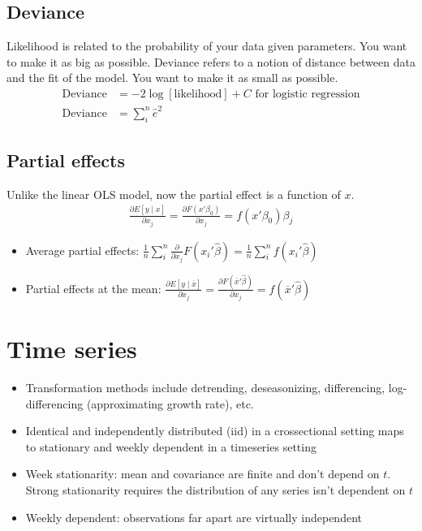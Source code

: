 \documentclass{article}
\begin{document}
\subsection{Deviance}
Likelihood is related to the probability of your data given parameters. You want to make it as big as possible. Deviance refers to a notion of distance between data and the fit of the model. You want to make it as small as possible.
\begin{align*}
  \textrm{Deviance} &= -2\log[\textrm{likelihood}] + C \textrm{ for logistic regression}\\
  \textrm{Deviance} &= \sum_i^n \hat{e}^2
\end{align*}

\subsection{Partial effects}
Unlike the linear OLS model, now the partial effect is a function of $x$.
\begin{align*}
  \frac{\partial E[y\mid x]}{\partial x_j} = \frac{\partial F(x'\beta_0)}{\partial x_j} = f(x'\beta_0)\beta_j
\end{align*}
\begin{itemize}
  \item Average partial effects: $\frac{1}{n}\sum_i^n\frac{\partial}{\partial x_j}F(x_i'\hat{\beta}) = \frac{1}{n}\sum_i^nf(x_i'\hat{\beta})$
  \item Partial effects at the mean: $\frac{\partial E[y \mid \overline{x}]}{\partial x_j} = \frac{\partial F(\overline{x}'\hat{\beta})}{\partial x_j} = f(\overline{x}'\hat{\beta})$
\end{itemize}




\section{Time series}

\begin{itemize}
  \item Transformation methods include detrending, deseasonizing, differencing, log-differencing (approximating growth rate), etc.
  \item Identical and independently distributed (iid) in a crossectional setting maps to stationary and weekly dependent in a timeseries setting
  \item Week stationarity: mean and covariance are finite and don't depend on $t$. Strong stationarity requires the distribution of any series isn't dependent on $t$
  \item Weekly dependent: observations far apart are virtually independent
\end{itemize}
\end{document}
